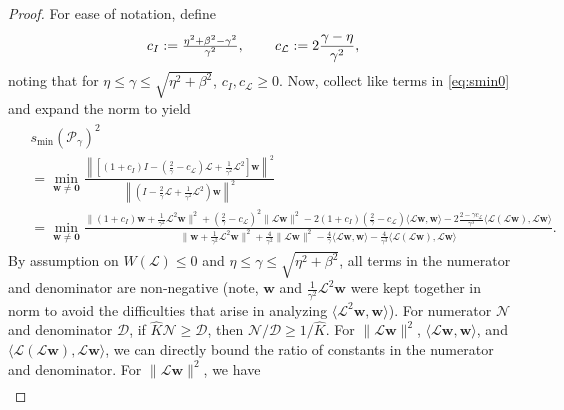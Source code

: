 \documentclass[a4paper,10pt]{article}
\begin{document}
\begin{proof}
For ease of notation, define
%
\begin{align*}
c_I & := \tfrac{\eta^2+\beta^2-\gamma^2}{\gamma^2} , \hspace{5ex}
c_{\mathcal{L}} := 2\frac{\gamma-\eta}{\gamma^2},
\end{align*}
%
noting that for $\eta\leq\gamma\leq\sqrt{\eta^2+\beta^2}$, $c_I,c_{\mathcal{L}} \geq 0$.
Now, collect like terms in \eqref{eq:smin0} and expand the norm to yield
%
\begin{align}\label{eq:smin_ex}
\begin{split}
& s_{\min}(\mathcal{P}_\gamma)^2 \\
& = \min_{\mathbf{w}\neq\mathbf{0}}
	\frac{\left\| \left[(1+c_I)I - (\tfrac{2}{\gamma}-c_{\mathcal{L}})\mathcal{L} +
		\tfrac{1}{\gamma^2}\mathcal{L}^2\right]\mathbf{w} \right\|^2}
	{\left\|\left(I - \tfrac{2}{\gamma}\mathcal{L} +
		\tfrac{1}{\gamma^2}\mathcal{L}^2\right)\mathbf{w} \right\|^2} \\
& =  \min_{\mathbf{w}\neq\mathbf{0}}
	\frac{\|(1+c_I)\mathbf{w}+\tfrac{1}{\gamma^2}\mathcal{L}^2\mathbf{w}\|^2 +
		(\tfrac{2}{\gamma}-c_{\mathcal{L}})^2\|\mathcal{L}\mathbf{w}\|^2 -
		2(1+c_I)(\tfrac{2}{\gamma}-c_{\mathcal{L}})\langle\mathcal{L}\mathbf{w},\mathbf{w}\rangle -
		2\tfrac{2-\gamma c_{\mathcal{L}}}{\gamma^3}\langle\mathcal{L}(\mathcal{L}\mathbf{w}),
			\mathcal{L}\mathbf{w}\rangle}
	{\|\mathbf{w}+\tfrac{1}{\gamma^2}\mathcal{L}^2\mathbf{w}\|^2 +
		\tfrac{4}{\gamma^2}\|\mathcal{L}\mathbf{w}\|^2 -
		\tfrac{4}{\gamma}\langle\mathcal{L}\mathbf{w},\mathbf{w}\rangle -
		\tfrac{4}{\gamma^3}\langle\mathcal{L}(\mathcal{L}\mathbf{w}),\mathcal{L}\mathbf{w}\rangle}.
\end{split}
\end{align}
%
By assumption on $W(\mathcal{L})\leq 0$ and $\eta\leq\gamma\leq\sqrt{\eta^2+\beta^2}$,
all terms in the numerator and denominator are non-negative (note, $\mathbf{w}$ and
$\tfrac{1}{\gamma^2}\mathcal{L}^2\mathbf{w}$ were kept together in norm to avoid
the difficulties that arise in analyzing $\langle\mathcal{L}^2\mathbf{w},\mathbf{w}\rangle$).
For numerator $\mathcal{N}$ and denominator $\mathcal{D}$, if $\widehat{K}\mathcal{N}
\geq \mathcal{D}$, then $\mathcal{N}/\mathcal{D} \geq 1 / \widehat{K}$. For 
$\|\mathcal{L}\mathbf{w}\|^2$, $\langle\mathcal{L}\mathbf{w},\mathbf{w}\rangle$,
and $\langle\mathcal{L}(\mathcal{L}\mathbf{w}),\mathcal{L}\mathbf{w}\rangle$,
we can directly bound the ratio of constants in the numerator and denominator.
For $\|\mathcal{L}\mathbf{w}\|^2$, we have
%
\begin{align*}

\end{align*}
\end{proof}
\end{document}
